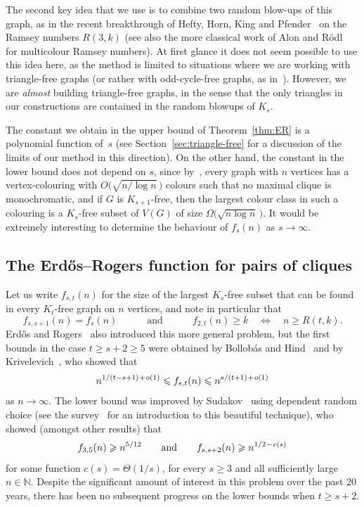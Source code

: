 \documentclass[12pt,reqno]{amsart}
\theoremstyle{remark}
\numberwithin{theorem}{section}
\renewcommand{\(}{\bigl(}
\renewcommand{\)}{\bigr)\vphantom{)}}
\newcommand{\p}{\hspace{0.02cm}+\hspace{0.02cm}}
\newcommand{\m}{\hspace{0.02cm}-\hspace{0.02cm}}
\renewcommand{\le}{\leqslant}
\renewcommand{\ge}{\geqslant}
\newcommand{\N}{\mathbb N}
\begin{document}
The second key idea that we use is to combine two random blow-ups of this graph, as in the recent breakthrough of Hefty, Horn, King and Pfender~\cite{HHKP25} on the Ramsey numbers $R(3,k)$ (see also the more classical work of Alon and R\"odl~\cite{AR} for multicolour Ramsey numbers). At first glance it does not seem possible to use this idea here, as the method is limited to situations where we are working with triangle-free graphs (or rather with odd-cycle-free graphs, as in~\cite{CJMPS25}). However, we are \emph{almost} building triangle-free graphs, in the sense that the only triangles in our constructions are contained in the random blowups of $K_s$. 

The constant we obtain in the upper bound of Theorem~\ref{thm:ER} is a polynomial function of~$s$ (see Section~\ref{sec:triangle-free} for a discussion of the limits of our method in this direction). On the other hand, the constant in the lower bound does not depend on $s$, since by~\cite[Corollary~2]{JMRS21}, every graph with $n$ vertices has a vertex-colouring with $O\big( \sqrt{n / \log n} \, \big)$ colours such that no maximal clique is monochromatic, and if $G$ is $K_{s+1}$-free, then the largest colour class in such a colouring is a $K_s$-free subset of $V(G)$ of size $\Omega\big( \displaystyle{\sqrt{n \log n}} \, \big)$. It would be extremely interesting to determine the behaviour of $f_s(n)$ as $s \to \infty$. 


\subsection{The Erd\H{o}s--Rogers function for pairs of cliques}\label{sec:cliques}

Let us write $f_{s,t}(n)$ for the size of the largest $K_s$-free subset that can be found in every $K_t$-free graph on $n$ vertices, and note in particular that 
$$f_{s,s+1}(n) = f_s(n) \quad \qquad \text{and} \qquad \quad f_{2,t}(n) \ge k \quad  \Leftrightarrow \quad n \ge R(t,k).$$
Erd\H{o}s and Rogers~\cite{ER62} also introduced this more general problem, but the first bounds in the case $t \ge s + 2 \ge 5$ were obtained by Bollobás and Hind~\cite{BH91} and by Krivelevich~\cite{Kr94,Kr95}, who showed that
\begin{equation}\label{eq:fst:general:bounds}
n^{1/(t-s+1) \p o(1)} \le f_{s,t}(n) \le n^{s/(t+1) \p o(1)}
\end{equation}
as $n \to \infty$. The lower bound was improved by Sudakov~\cite{Su05a,Su05b} using dependent random choice (see the survey~\cite{DRC} for an introduction to this beautiful technique), who showed (amongst other results) that
$$f_{3,5}(n) \ge n^{5/12} \qquad \text{and} \qquad f_{s,s+2}(n) \ge n^{1/2 \m c(s)}$$
for some function $c(s) = \Theta(1/s)$, for every $s \ge 3$ and all sufficiently large $n \in \N$. Despite the significant amount of interest in this problem over the past 20 years, there has been no subsequent progress on the lower bounds when $t \ge s + 2$.
\end{document}
